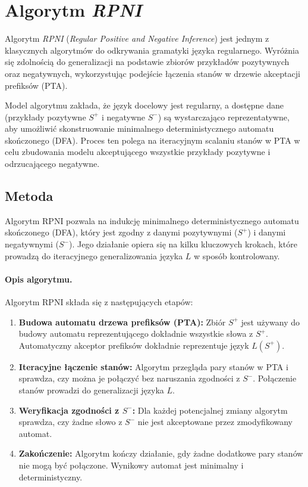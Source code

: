\section{Algorytm \textit{RPNI}}
\label{sec:rpni}

Algorytm \textit{RPNI} (\textit{Regular Positive and Negative Inference}) \cite{RPNI} jest jednym z klasycznych algorytmów do odkrywania gramatyki języka regularnego. Wyróżnia się zdolnością do generalizacji na podstawie zbiorów przykładów pozytywnych oraz negatywnych, wykorzystując podejście łączenia stanów w drzewie akceptacji prefiksów (PTA).

Model algorytmu zakłada, że język docelowy jest regularny, a dostępne dane (przykłady pozytywne \( S^+ \) i negatywne \( S^- \)) są wystarczająco reprezentatywne, aby umożliwić skonstruowanie minimalnego deterministycznego automatu skończonego (DFA). Proces ten polega na iteracyjnym scalaniu stanów w PTA w celu zbudowania modelu akceptującego wszystkie przykłady pozytywne i odrzucającego negatywne.

\subsection{Metoda}

Algorytm RPNI pozwala na indukcję minimalnego deterministycznego automatu skończonego (DFA), który jest zgodny z danymi pozytywnymi (\( S^+ \)) i danymi negatywnymi (\( S^- \)). Jego działanie opiera się na kilku kluczowych krokach, które prowadzą do iteracyjnego generalizowania języka \( L \) w sposób kontrolowany.

\paragraph*{Opis algorytmu.}
Algorytm RPNI składa się z następujących etapów:
\begin{enumerate}
    \item \textbf{Budowa automatu drzewa prefiksów (PTA):}
        Zbiór \( S^+ \) jest używany do budowy automatu reprezentującego dokładnie wszystkie słowa z \( S^+ \). Automatyczny akceptor prefiksów dokładnie reprezentuje język \( L(S^+) \).
    \item \textbf{Iteracyjne łączenie stanów:}
        Algorytm przegląda pary stanów w PTA i sprawdza, czy można je połączyć bez naruszania zgodności z \( S^- \). Połączenie stanów prowadzi do generalizacji języka \( L \).
    \item \textbf{Weryfikacja zgodności z \( S^- \):}
        Dla każdej potencjalnej zmiany algorytm sprawdza, czy żadne słowo z \( S^- \) nie jest akceptowane przez zmodyfikowany automat.
    \item \textbf{Zakończenie:} 
        Algorytm kończy działanie, gdy żadne dodatkowe pary stanów nie mogą być połączone. Wynikowy automat jest minimalny i deterministyczny.
\end{enumerate}

